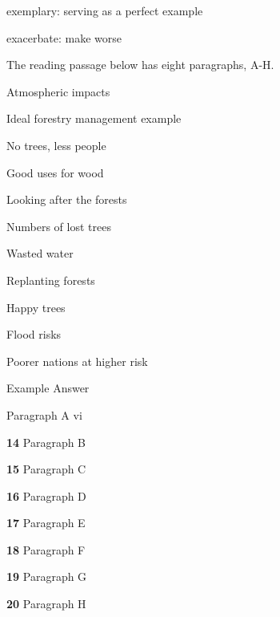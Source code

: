 \documentclass{../templateReading/cdreading}
\begin{document}

exemplary: serving as a perfect example

exacerbate: make worse


The reading passage below has eight paragraphs, A-H.



 Atmospheric impacts

 Ideal forestry management example

 No trees, less people

 Good uses for wood

 Looking after the forests

 Numbers of lost trees

 Wasted water

 Replanting forests

 Happy trees

 Flood risks

 Poorer nations at higher risk

Example             Answer

Paragraph A      vi

\textbf{14} Paragraph B

\textbf{15} Paragraph C

\textbf{16} Paragraph D

\textbf{17} Paragraph E

\textbf{18} Paragraph F

\textbf{19} Paragraph G

\textbf{20} Paragraph H




\end{document}
